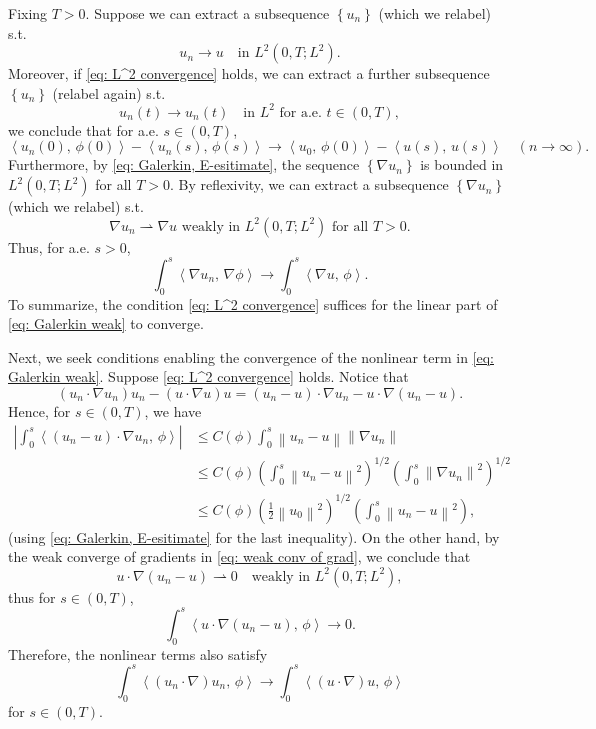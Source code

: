 \documentclass[a4paper, 12pt, oneside]{amsart}
\theoremstyle{definition}
\theoremstyle{remark}
\newcommand{\abs}[1]{\left\lvert #1 \right\rvert}
\newcommand{\norm}[1]{\left\lVert #1 \right\rVert}
\newcommand{\bk}[2]{\left\langle #1,\, #2 \right\rangle}
\newcommand{\set}[1]{\left\{ #1 \right\}}
\renewcommand{\leq}{\leqslant}
\newcommand{\f}[2]{\frac{#1}{#2}}
\newcommand{\wto}{\rightharpoonup}
\begin{document}
Fixing $T>0$. Suppose we can extract a subsequence $\set{u_n}$ (which we relabel) s.t. 
\begin{equation}
    \label{eq: L^2 convergence}
    u_n\to u\quad\text{in $L^2(0, T; L^2)$}.
\end{equation}
Moreover, if \eqref{eq: L^2 convergence} holds, we can extract a further subsequence $\set{u_{n}}$ (relabel again) s.t.
\[
    u_{n}(t)\to u_{n}(t)\quad\text{in $L^2$ for a.e. $t\in (0, T)$},
\]
we conclude that for a.e. $s\in (0, T)$,
\[
    \bk{u_n(0)}{\phi(0)}-\bk{u_n(s)}{\phi(s)}\to \bk{u_0}{\phi(0)}-\bk{u(s)}{u(s)}\quad (n\to\infty).
\]
Furthermore, by \eqref{eq: Galerkin, E-esitimate}, the sequence $\set{\nabla u_n}$ is bounded in $L^2(0, T; L^2)$ for all $T>0$. By reflexivity, we can extract a subsequence $\set{\nabla u_n}$ (which we relabel) s.t.
\begin{equation}
    \label{eq: weak conv of grad}
    \text{$\nabla u_n\wto\nabla u$ weakly in $L^2(0, T; L^2)$ for all $T>0$}.
\end{equation}
Thus, for a.e. $s>0$,
\[
    \int_0^s\bk{\nabla u_n}{\nabla\phi}\to\int_0^s\bk{\nabla u}{\phi}.
\]
To summarize, the condition \eqref{eq: L^2 convergence} suffices for the linear part of \eqref{eq: Galerkin weak} to converge.

Next, we seek conditions enabling the convergence of the nonlinear term in \eqref{eq: Galerkin weak}. Suppose \eqref{eq: L^2 convergence} holds. Notice that
\[
    (u_n\cdot\nabla u_n)u_n - (u\cdot\nabla u)u = (u_n-u)\cdot\nabla u_n - u\cdot\nabla (u_n-u).
\]
Hence, for $s\in (0, T)$, we have
\begin{align*}
    \abs{\int_0^s \bk{(u_n-u)\cdot\nabla u_n}{\phi}}&\leq C(\phi)\int_0^s\norm{u_n-u}\norm{\nabla u_n}\\
    &\leq C(\phi)\left(\int_0^s\norm{u_n-u}^2\right)^{1/2}\left(\int_0^s\norm{\nabla u_n}^2\right)^{1/2}\\
    &\leq C(\phi)\left(\f{1}{2}\norm{u_0}^2\right)^{1/2}\left(\int_0^s\norm{u_n-u}^2\right),
\end{align*}
(using \eqref{eq: Galerkin, E-esitimate} for the last inequality). On the other hand, by the weak converge of gradients in \eqref{eq: weak conv of grad}, we conclude that
\[
    u\cdot\nabla(u_n-u)\wto 0\quad\text{weakly in $L^2(0, T; L^2)$},
\]
thus for $s\in (0, T)$,
\[
    \int_0^s\bk{u\cdot\nabla(u_n-u)}{\phi}\to 0.
\]
Therefore, the nonlinear terms also satisfy
\[
    \int_0^s\bk{(u_n\cdot\nabla)u_n}{\phi}\to\int_0^s\bk{(u\cdot\nabla)u}{\phi}
\]
for $s\in (0, T).$
\end{document}
